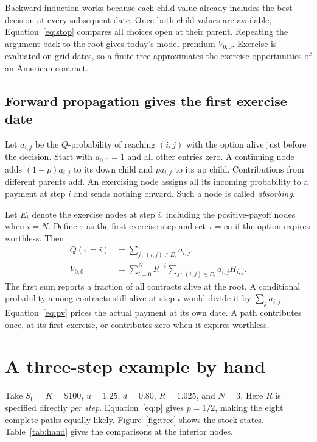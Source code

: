 \documentclass[11pt]{article}
\begin{document}
Backward induction works because each child value already includes the best decision at every subsequent date. Once both child values are available, Equation~\eqref{eq:stop} compares all choices open at their parent. Repeating the argument back to the root gives today's model premium $V_{0,0}$. Exercise is evaluated on grid dates, so a finite tree approximates the exercise opportunities of an American contract.

\subsection{Forward propagation gives the first exercise date}
Let $a_{i,j}$ be the $Q$-probability of reaching $(i,j)$ with the option alive just before the decision. Start with $a_{0,0}=1$ and all other entries zero. A continuing node adds $(1-p)a_{i,j}$ to its down child and $pa_{i,j}$ to its up child. Contributions from different parents add. An exercising node assigns all its incoming probability to a payment at step $i$ and sends nothing onward. Such a node is called \emph{absorbing}.

Let $E_i$ denote the exercise nodes at step $i$, including the positive-payoff nodes when $i=N$. Define $\tau$ as the first exercise step and set $\tau=\infty$ if the option expires worthless. Then
\begin{align}
 Q(\tau=i)&=\sum_{j\,:\,(i,j)\in E_i} a_{i,j}, \label{eq:mass}\\
 V_{0,0}&=\sum_{i=0}^{N}R^{-i}
             \sum_{j\,:\,(i,j)\in E_i}a_{i,j}H_{i,j}. \label{eq:pv}
\end{align}
The first sum reports a fraction of all contracts alive at the root. A conditional probability among contracts still alive at step $i$ would divide it by $\sum_j a_{i,j}$. Equation~\eqref{eq:pv} prices the actual payment at its own date. A path contributes once, at its first exercise, or contributes zero when it expires worthless.

\section{A three-step example by hand}
Take $S_0=K=\$100$, $u=1.25$, $d=0.80$, $R=1.025$, and $N=3$. Here $R$ is specified directly \emph{per step}. Equation~\eqref{eq:p} gives $p=1/2$, making the eight complete paths equally likely. Figure~\ref{fig:tree} shows the stock states. Table~\ref{tab:hand} gives the comparisons at the interior nodes.
\end{document}
